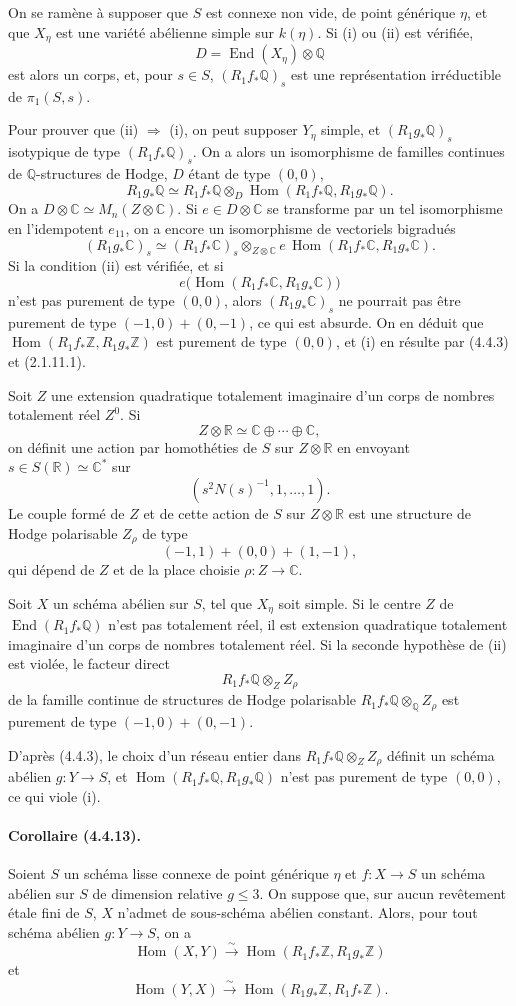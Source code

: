 \documentclass[10pt]{article}
\newcommand{\C}{\mathbb C}
\newcommand{\Q}{\mathbb Q}
\newcommand{\Z}{\mathbb Z}
\newcommand{\Hom}{\operatorname{Hom}}
\newcommand{\iso}{\xrightarrow{\sim}}
\newcommand{\R}{\mathbb R}
\providecommand{\End}{\operatorname{End}}
\begin{document}
On se ramène à supposer que $S$ est connexe non vide, de point générique $\eta$, et que $X_\eta$ est une variété abélienne simple sur $k(\eta)$. Si (i) ou (ii) est vérifiée,
\[
D=\End(X_\eta)\otimes\Q
\]
est alors un corps, et, pour $s\in S$, $(R_1f_*\Q)_s$ est une représentation irréductible de $\pi_1(S,s)$.

Pour prouver que (ii) $\Rightarrow$ (i), on peut supposer $Y_\eta$ simple, et $(R_1g_*\Q)_s$ isotypique de type $(R_1f_*\Q)_s$. On a alors un isomorphisme de familles continues de $\Q$-structures de Hodge, $D$ étant de type $(0,0)$,
\[
R_1g_*\Q\simeq R_1f_*\Q\otimes_D
\Hom(R_1f_*\Q,R_1g_*\Q).
\]
On a $D\otimes\C\simeq M_n(Z\otimes\C)$. Si $e\in D\otimes\C$ se transforme par un tel isomorphisme en l'idempotent $e_{11}$, on a encore un isomorphisme de vectoriels bigradués
\[
(R_1g_*\C)_s\simeq (R_1f_*\C)_s\otimes_{Z\otimes\C}
e\,\Hom(R_1f_*\C,R_1g_*\C).
\]
Si la condition (ii) est vérifiée, et si
\[
e\bigl(\Hom(R_1f_*\C,R_1g_*\C)\bigr)
\]
n'est pas purement de type $(0,0)$, alors $(R_1g_*\C)_s$ ne pourrait pas être purement de type $(-1,0)+(0,-1)$, ce qui est absurde. On en déduit que $\Hom(R_1f_*\Z,R_1g_*\Z)$ est purement de type $(0,0)$, et (i) en résulte par (4.4.3) et (2.1.11.1).

Soit $Z$ une extension quadratique totalement imaginaire d'un corps de nombres totalement réel $Z^0$. Si
\[
Z\otimes\R\simeq \C\oplus\cdots\oplus\C,
\]
on définit une action par homothéties de $S$ sur $Z\otimes\R$ en envoyant $s\in S(\R)\simeq\C^*$ sur
\[
(s^2N(s)^{-1},1,\ldots,1).
\]
Le couple formé de $Z$ et de cette action de $S$ sur $Z\otimes\R$ est une structure de Hodge polarisable $Z_\rho$ de type
\[
(-1,1)+(0,0)+(1,-1),
\]
qui dépend de $Z$ et de la place choisie $\rho:Z\to\C$.

Soit $X$ un schéma abélien sur $S$, tel que $X_\eta$ soit simple. Si le centre $Z$ de $\End(R_1f_*\Q)$ n'est pas totalement réel, il est extension quadratique totalement imaginaire d'un corps de nombres totalement réel. Si la seconde hypothèse de (ii) est violée, le facteur direct
\[
R_1f_*\Q\otimes_Z Z_\rho
\]
de la famille continue de structures de Hodge polarisable $R_1f_*\Q\otimes_\Q Z_\rho$ est purement de type $(-1,0)+(0,-1)$.

D'après (4.4.3), le choix d'un réseau entier dans $R_1f_*\Q\otimes_Z Z_\rho$ définit un schéma abélien $g:Y\to S$, et $\Hom(R_1f_*\Q,R_1g_*\Q)$ n'est pas purement de type $(0,0)$, ce qui viole (i).

\paragraph{Corollaire (4.4.13).} Soient $S$ un schéma lisse connexe de point générique $\eta$ et $f:X\to S$ un schéma abélien sur $S$ de dimension relative $g\le3$. On suppose que, sur aucun revêtement étale fini de $S$, $X$ n'admet de sous-schéma abélien constant. Alors, pour tout schéma abélien $g:Y\to S$, on a
\[
\Hom(X,Y)\iso \Hom(R_1f_*\Z,R_1g_*\Z)
\]
et
\[
\Hom(Y,X)\iso \Hom(R_1g_*\Z,R_1f_*\Z).
\]
\end{document}
